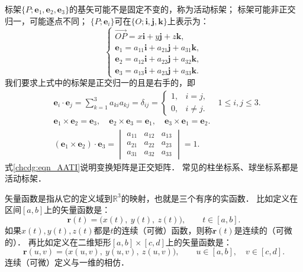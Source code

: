 标架$\{P;\boldsymbol{e}_1,\boldsymbol{e}_2,\boldsymbol{e}_3\}$的基矢可能不是固定不变的，称为{\heiti 活动标架}；
标架可能非正交归一，可能逐点不同；
$\{P;\boldsymbol{e}_i\}$可在$\{O;\boldsymbol{i},\boldsymbol{j},\boldsymbol{k}\}$上表示为：
\begin{equation}\label{chcdg:eqn_eAi}
\begin{cases}
    \overrightarrow{OP} = x \boldsymbol{i} + y \boldsymbol{j} + z \boldsymbol{k} , \\
    \boldsymbol{e}_1 =  a_{11} \boldsymbol{i} + a_{21} \boldsymbol{j} + a_{31} \boldsymbol{k} , \\
    \boldsymbol{e}_2 =  a_{12} \boldsymbol{i} + a_{22} \boldsymbol{j} + a_{32} \boldsymbol{k} , \\
    \boldsymbol{e}_3 =  a_{13} \boldsymbol{i} + a_{23} \boldsymbol{j} + a_{33} \boldsymbol{k} .
\end{cases}    
\end{equation}
我们要求上式中的标架是正交归一的且是右手的，即
\begin{align}
    &\boldsymbol{e}_i \cdot \boldsymbol{e}_j = \sum_{k=1}^{3} a_{ki} a_{kj} = \delta_{ij}
    =\begin{cases}  1,& i=j, \\ 0,& i\neq j. \end{cases} \quad
    1 \leqslant i,j \leqslant 3. \label{chcdg:eqn_AATI}\\
    & \boldsymbol{e}_1\times \boldsymbol{e}_2 =\boldsymbol{e}_3, \quad
    \boldsymbol{e}_2\times \boldsymbol{e}_3 =\boldsymbol{e}_1, \quad
    \boldsymbol{e}_3\times \boldsymbol{e}_1 =\boldsymbol{e}_2. \\
    &(\boldsymbol{e}_1\times \boldsymbol{e}_2)\cdot \boldsymbol{e}_3 =
    \begin{vmatrix}
        a_{11}& a_{12} & a_{13} \\ a_{21}& a_{22} & a_{23} \\a_{31}& a_{32} & a_{33}
    \end{vmatrix} = 1 .
\end{align}
式\eqref{chcdg:eqn_AATI}说明变换矩阵是正交矩阵．
常见的柱坐标系、球坐标系都是活动标架．

{\heiti 矢量函数}是指从它的定义域到$\mathbb{R}^3$的映射，也就是三个有序的实函数．
比如定义在区间$[a,b]$上的矢量函数是：
\begin{equation}
    \boldsymbol{r}(t) = \bigl(x(t), \  y(t),\  z(t)\bigr),\qquad t\in [a,b].
\end{equation}
如果$x(t),y(t),z(t)$都是$t$的连续（可微）函数，则称$\boldsymbol{r}(t)$是连续的（可微的）．
再比如定义在二维矩形$[a,b]\times [c,d]$上的矢量函数是：
\begin{equation}
    \boldsymbol{r}(u,v) = \bigl(x(u,v), \  y(u,v),\  z(u,v)\bigr),
    \qquad u\in [a,b],\quad v\in [c,d].
\end{equation}
连续（可微）定义与一维的相仿．

